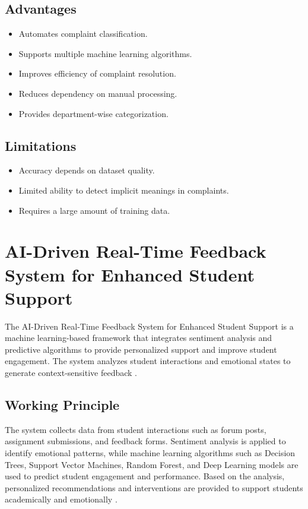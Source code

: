 \documentclass[12pt,a4paper]{report}
\begin{document}
\subsection{Advantages}
\begin{itemize}[nolistsep]
    \item Automates complaint classification.
    \item Supports multiple machine learning algorithms.
    \item Improves efficiency of complaint resolution.
    \item Reduces dependency on manual processing.
    \item Provides department-wise categorization.
\end{itemize}

\subsection{Limitations}
\begin{itemize}[nolistsep]
    \item Accuracy depends on dataset quality.
    \item Limited ability to detect implicit meanings in complaints.
    \item Requires a large amount of training data.
\end{itemize}

\section{AI-Driven Real-Time Feedback System for Enhanced Student Support}
The AI-Driven Real-Time Feedback System for Enhanced Student Support is a machine learning-based framework that integrates sentiment analysis and predictive algorithms to provide personalized support and improve student engagement. The system analyzes student interactions and emotional states to generate context-sensitive feedback \cite{prakash2024}.

\subsection{Working Principle}
The system collects data from student interactions such as forum posts, assignment submissions, and feedback forms. Sentiment analysis is applied to identify emotional patterns, while machine learning algorithms such as Decision Trees, Support Vector Machines, Random Forest, and Deep Learning models are used to predict student engagement and performance. Based on the analysis, personalized recommendations and interventions are provided to support students academically and emotionally \cite{prakash2024}.
\end{document}
